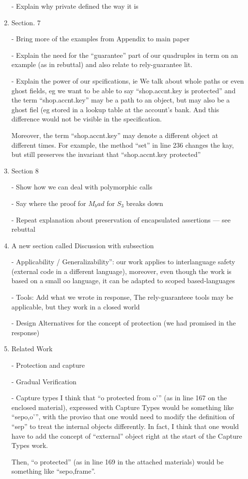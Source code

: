 \documentclass[acmsmall,review,anonymous]{acmart}\settopmatter{printfolios=true}
\begin{document}
\begin{enumerate}
- Explain why private defined the way it is

 


\item
Section. 7 

- Bring more of the examples from Appendix to main paper

- Explain the need for the “guarantee” part of our quadruples in term on an example (as in rebuttal) and also relate to rely-guarantee lit.

- Explain the power of our spcifications, ie
We talk about whole paths or even ghost fields, eg we want to be able to say
            “shop.accnt.key is protected”
and the term “shop.accnt.key” may be a path to an object, but may also be a ghost fiel (eg stored in a lookup table at the account’s bank. And this difference would not be visible in the specification.

Moreover, the term “shop.accnt.key” may denote a different object at different times. For example, the method “set” in line 236 changes the kay, but still preserves the invariant that 
            “shop.accnt.key protected”

\item
Section 8

- Show how we can deal with polymorphic calls \

- Say where the proof for $M_bad$ for $S_3$ breaks down\

- Repeat explanation about preservation of encapsulated assertions — see rebuttal

\item
A new section called Discussion with subsection

- Applicability / Generalizability”: our work applies to interlanguage safety (external code in a different language), moreover, even though the work is based on a small oo language, it can be adapted to scoped based-languages

- Tools: Add what we wrote in response, The rely-guaranteee tools may be applicable, but they work in a closed world

- Design Alternatives for the concept of protection (we had promised in the response)

\item
Related Work

- Protection and capture

- Gradual Verification 

- Capture types
I think that “o protected from o’” (as in line 167 on the enclosed material), expressed with Capture Types would be something like “sep{o,o’}”, with the proviso that one would need to modify the definition of “sep” to treat the internal objects differently. In fact, I think that one would have to add the concept of “external” object right at the start of the Capture Types work.
 
Then, “o protected” (as in line 169 in the attached materials) would be something like “sep{o,frame}”.
 

            
\end{enumerate}
 
\end{document}
